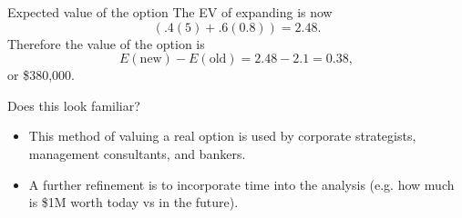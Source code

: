 \documentclass{beamer}\usepackage[]{graphicx}\usepackage[]{color}
\begin{document}
\begin{darkframes}
    \begin{frame}[fragile]{Expected value of the option}
        The EV of expanding is now
        \[ (.4(5) + .6(0.8)) = 2.48. \]
        \pause
        Therefore the value of the option is
        \[ E(\text{new}) - E(\text{old}) = 2.48 - 2.1 = 0.38, \]
        or \$380,000.
    \end{frame}


    \begin{frame}[fragile]{Does this look familiar?}
      \begin{itemize}[<+->]
        \item This method of valuing a real option is used by corporate strategists, management consultants, and bankers.
        \item A further refinement is to incorporate time into the analysis (e.g. how much is \$1M worth today vs in the future).
      \end{itemize}
    \end{frame}
  \end{darkframes}
\end{document}
